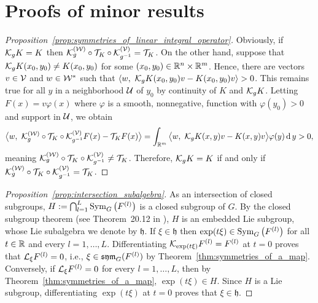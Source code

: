 \documentclass[twoside,11pt]{article}
\begin{document}
\appendix

\section{Proofs of minor results}
\label{app:proofs_of_minor_results}

\begin{proof}[Proposition~\ref{prop:symmetries_of_linear_integral_operator}]
    \label{proof:symmetries_of_linear_integral_operator}
    Obviously, if ${\mathcal{K}}_g K = K$ then ${\mathcal{K}}_{g}^{({\mathcal{W}})} \circ {\mathcal{T}}_K \circ {\mathcal{K}}_{g^{-1}}^{({\mathcal{V}})} = {\mathcal{T}}_K$.
    On the other hand, suppose that ${\mathcal{K}}_g K(x_0,y_0) \neq K(x_0,y_0)$ for some $(x_0,y_0) \in \mathbb{R}^n \times \mathbb{R}^m$.
    Hence, there are vectors $v\in{\mathcal{V}}$ and $w \in {\mathcal{W}}^*$ such that $\langle w, \ {\mathcal{K}}_g K(x_0,y_0) v - K(x_0,y_0) v \rangle > 0$.
    This remains true for all $y$ in a neighborhood ${\mathcal{U}}$ of $y_0$ by continuity of $K$ and ${\mathcal{K}}_g K$.
    Letting $F(x) = v \varphi(x)$ where $\varphi$ is a smooth, nonnegative, function with $\varphi(y_0) > 0$ and support in ${\mathcal{U}}$, we obtain
    \begin{equation}
        \big\langle w, \ {\mathcal{K}}_{g}^{({\mathcal{W}})} \circ {\mathcal{T}}_K \circ {\mathcal{K}}_{g^{-1}}^{({\mathcal{V}})} F(x) - {\mathcal{T}}_K F(x)\big\rangle
        = \int_{\mathbb{R}^m} \big\langle w, \ {\mathcal{K}}_g K(x,y) v - K(x,y) v \big\rangle \varphi(y) \operatorname{\mathrm{d}} y > 0,
    \end{equation}
    meaning ${\mathcal{K}}_{g}^{({\mathcal{W}})} \circ {\mathcal{T}}_K \circ {\mathcal{K}}_{g^{-1}}^{({\mathcal{V}})} \neq {\mathcal{T}}_K$.
    Therefore, ${\mathcal{K}}_g K = K$ if and only if ${\mathcal{K}}_{g}^{({\mathcal{W}})} \circ {\mathcal{T}}_K \circ {\mathcal{K}}_{g^{-1}}^{({\mathcal{V}})} = {\mathcal{T}}_K$.
\end{proof}

\begin{proof}[Proposition~\ref{prop:intersection_subalgebra}]
    \label{proof:intersection_subalgebra}
    As an intersection of closed subgroups, $H := \bigcap_{l=1}^L \operatorname{Sym}_G\big(F^{(l)}\big)$ is a closed subgroup of $G$.
    By the closed subgroup theorem (see Theorem~20.12 in \citet{Lee2013introduction}), $H$ is an embedded Lie subgroup, whose Lie subalgebra we denote by $\mathfrak{h}$.
    If $\xi \in \mathfrak{h}$ then $\exp(t\xi)\in \operatorname{Sym}_G\big(F^{(l)}\big)$ for all $t\in\mathbb{R}$ and every $l=1,\ldots,L$.
    Differentiating ${\mathcal{K}}_{\exp(t\xi)} F^{(l)} = F^{(l)}$ at $t = 0$ proves that ${\mathcal{L}}_{\xi} F^{(l)} = 0$, i.e., $\xi\in\operatorname{\mathfrak{sym}}_G(F^{(l)})$ by Theorem~\ref{thm:symmetries_of_a_map}.
    Conversely, if ${\mathcal{L}}_{\xi} F^{(l)} = 0$ for every $l=1,\ldots,L$, then by Theorem~\ref{thm:symmetries_of_a_map}, $\exp(t\xi) \in H$.
    Since $H$ is a Lie subgroup, differentiating $\exp(t\xi)$ at $t=0$ proves that $\xi \in \mathfrak{h}$.
\end{proof}
\end{document}
